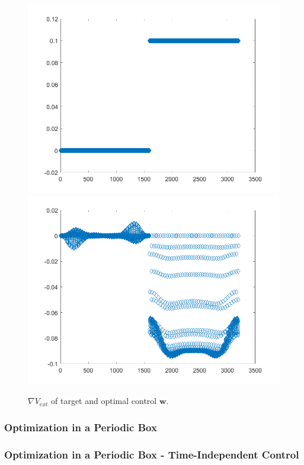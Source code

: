 \documentclass[11pt, a4paper]{article}
\theoremstyle{definition}
\newcommand{\w}{\mathbf{w}}
\begin{document}
\begin{figure}[h]
	\centering
	\includegraphics[scale=0.35]{V1.png}
	\includegraphics[scale=0.35]{W1.png}
	\caption{$\nabla V_{ext}$ of target and optimal control $\w$.} 
	\label{F1a}
\end{figure}

\subsubsection{Optimization in a Periodic Box}

\subsubsection{Optimization in a Periodic Box - Time-Independent Control}
\end{document}
